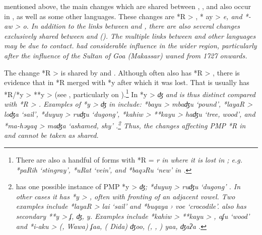  mentioned above, the main changes which are shared between
, , and  also occur in ,
as well as some other  languages.
These changes are *R > {\0}, * ay > \it{e,}
and *-aw > \it{o}.
In addition to the links between 
and , there are also several changes exclusively shared
between  and  ().
The multiple links between 
and other languages may be due to contact.
 had considerable influence in the wider region,
particularly after the influence of the Sultan of Goa (Makassar)
waned from 1727 onwards.

The change *R > {\0} is shared by  and .
Although  often also has *R > {\0},
there is evidence that in  *R merged with *y
after which it was lost.
That is  usually has *R/*y > **y > {\0} (see ,
particularly  on ).\footnote{
		There are also a handful of forms with *R = \it{r} in 
		where it is lost in ; e.g.
		*paRih ‘stingray’, *uRat ‘vein’, and *baqəRu ‘new’ in .}
In  *y > \it{ʤ}
and is thus distinct compared with *R > {\0}.
Examples of *y > \it{ʤ} in  include: *bayu > \it{mbaʤu} ‘pound’,
*layaR > \it{loʤa} ‘sail’,
*duyuŋ > \it{ruʤu} ‘dugong’,
*kahiw > **kayu > \it{haʤu} ‘tree,
wood’, and *ma-həyaq > \it{maʤa} ‘ashamed,
shy’ \citep[80]{Blust2008}.\footnote{
		 has one possible instance
		of PMP *y > \it{ʤ}; *duyuŋ > \it{ruʤu} ‘dugong’ \citep[332]{Jonker1908}.
		In other cases it has *y > {\0},
		often with fronting of an adjacent vowel.
		Two examples include *layaR > \it{lai} ‘sail’
		and *buqaya › \it{voe} ‘crocodile’.
		 also has secondary **y > \it{ʄ}, \it{ʤ}, \it{y}.
		Examples include *kahiw > **kayu > ,
		 \it{aʄu} ‘wood’ and *i-aku >  (,
		 Wawa) \it{ʄaa},  ( D{\Q}ida) \it{ʤoo},
		 (, , ) \it{yaa},  \it{ʤaʔa} .}
Thus, the changes affecting PMP *R in 
and  cannot be taken as shared.

